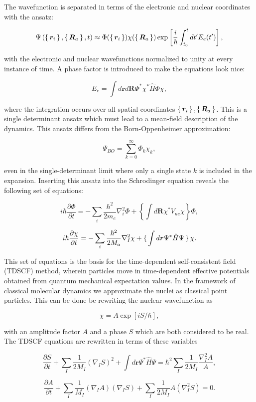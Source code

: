 The wavefunction is separated in terms of the electronic and nuclear
coordinates with the ansatz:

$$ \Psi \left(\set{\bm{r}_i}, \set{\bm{R}_a}, t \right)
    \approx \Phi(\set{\bm{r}_i}) \chi(\set{\bm{R}_a})
    \exp \left[ \frac{i}{\hbar} \int_{t_0}^t
    dt' E_e(t') \right] ,
$$

with the electronic and nuclear wavefunctions normalized to unity
at every instance of time. A phase factor is introduced to make
the equations look nice:

$$ E_e = \int d\bm{r} d\bm{R} \Phi^* \chi^* \hat{H} \Phi \chi , $$

where the integration occurs over all spatial coordinates
$\set{\bm{r}_i}, \set{\bm{R}_a}$. This is a single determinant
ansatz which must lead to a mean-field description of the dynamics.
This ansatz differs from the Born-Oppenheimer approximation:

$$ \Psi_{BO} = \sum_{k=0}^{\infty} \Phi_k \chi_k , $$

even in the single-determinant limit where only
a single state $k$ is included in the expansion.
Inserting this ansatz into the Schrodinger equation
reveals the following set of equations:

$$ i\hbar \frac{\partial \Phi}{\partial t}
    = -\sum_i \frac{\hbar^2}{2m_e} \nabla_i^2 \Phi
    + \left\{ \int d\bm{R} \chi^* V_{ne} \chi \right\} \Phi , $$

$$ i\hbar \frac{\partial \chi}{\partial t}
    = -\sum_i \frac{\hbar^2}{2M_a} \nabla_I^2 \chi
    + \set{ \int d\bm{r} \Psi^* \hat{H} \Psi } \chi . $$

This set of equations is the basis for the time-dependent
self-consistent field (TDSCF) method, wherein particles move
in time-dependent effective potentials obtained from quantum
mechanical expectation values.
In the framework of classical molecular dynamics
we approximate the nuclei as classical point particles.
This can be done be rewriting the nuclear wavefunction as

$$ \chi = A \exp[iS/\hbar] , $$

with an amplitude factor $A$ and a phase $S$
which are both considered to be real.
The TDSCF equations are rewritten in terms of these variables

$$ \frac{\partial S}{\partial t} + \sum_I \frac{1}{2M_I}
    (\nabla_I S)^2 + \int d\bm{r} \Psi^* \hat{H} \Psi
    = \hbar^2 \sum_I \frac{1}{2M_I} \frac{\nabla_I^2 A}{A} , $$

$$ \frac{\partial A}{\partial t} + \sum_I \frac{1}{M_I} (\nabla_I A)
    (\nabla_I S) + \sum_I \frac{1}{2M_I} A (\nabla_I^2 S) = 0 . $$

